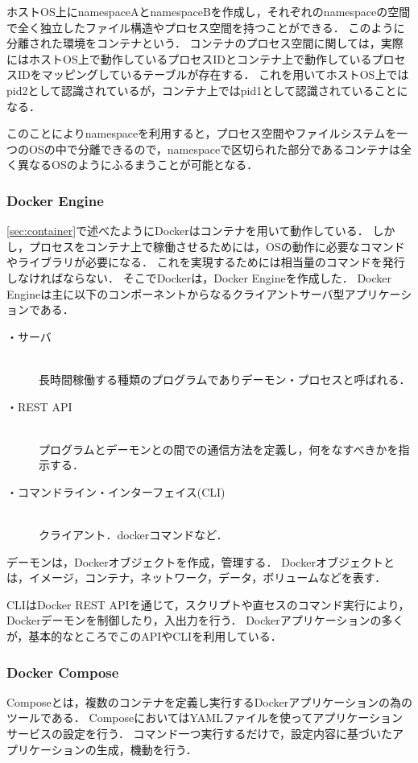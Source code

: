 ホストOS上にnamespaceAとnamespaceBを作成し，それぞれのnamespaceの空間で全く独立したファイル構造やプロセス空間を持つことができる．
このように分離された環境をコンテナという．
コンテナのプロセス空間に関しては，実際にはホストOS上で動作しているプロセスIDとコンテナ上で動作しているプロセスIDをマッピングしているテーブルが存在する．
これを用いてホストOS上ではpid2として認識されているが，コンテナ上ではpid1として認識されていることになる．

このことによりnamespaceを利用すると，プロセス空間やファイルシステムを一つのOSの中で分離できるので，namespaceで区切られた部分であるコンテナは全く異なるOSのようにふるまうことが可能となる．

\subsubsection{Docker Engine}
\ref{sec:container}で述べたようにDockerはコンテナを用いて動作している．
しかし，プロセスをコンテナ上で稼働させるためには，OSの動作に必要なコマンドやライブラリが必要になる．
これを実現するためには相当量のコマンドを発行しなければならない．
そこでDockerは，Docker Engineを作成した．
Docker Engineは主に以下のコンポーネントからなるクライアントサーバ型アプリケーションである．

\begin{description}
    \item[・サーバ]\mbox{}\\
        長時間稼働する種類のプログラムでありデーモン・プロセスと呼ばれる．
    \item[・REST API]\mbox{}\\
        プログラムとデーモンとの間での通信方法を定義し，何をなすべきかを指示する．
    \item[・コマンドライン・インターフェイス(CLI)]\mbox{}\\
        クライアント．dockerコマンドなど．
\end{description}

デーモンは，Dockerオブジェクトを作成，管理する．
Dockerオブジェクトとは，イメージ，コンテナ，ネットワーク，データ，ボリュームなどを表す．

CLIはDocker REST APIを通じて，スクリプトや直セスのコマンド実行により，Dockerデーモンを制御したり，入出力を行う．
Dockerアプリケーションの多くが，基本的なところでこのAPIやCLIを利用している．

\subsubsection{Docker Compose}
Composeとは，複数のコンテナを定義し実行するDockerアプリケーションの為のツールである．
ComposeにおいてはYAML\cite{YAML}ファイルを使ってアプリケーションサービスの設定を行う．
コマンド一つ実行するだけで，設定内容に基づいたアプリケーションの生成，機動を行う．

